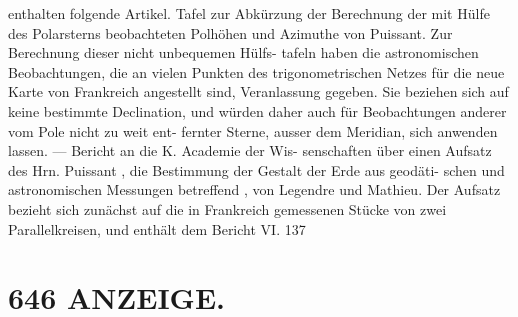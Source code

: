 \documentclass[12pt,a4paper]{article}
\begin{document}
{{{{{{{{enthalten  folgende  Artikel.  Tafel  zur  Abkürzung  der  Berechnung  der  mit  Hülfe  des  Polarsterns beobachteten  Polhöhen  und  Azimuthe  von  Puissant.  Zur  Berechnung  dieser  nicht  unbequemen  Hülfs- tafeln  haben  die  astronomischen  Beobachtungen,  die  an  vielen  Punkten  des  trigonometrischen  Netzes für  die  neue  Karte  von  Frankreich  angestellt  sind,  Veranlassung  gegeben.  Sie  beziehen  sich  auf  keine bestimmte  Declination,  und  würden  daher  auch  für  Beobachtungen  anderer  vom  Pole  nicht  zu  weit  ent- fernter Sterne,  ausser  dem  Meridian,  sich  anwenden  lassen.  ---  Bericht  an  die  K.  Academie  der  Wis- senschaften über  einen  Aufsatz  des  Hrn.  Puissant  ,  die  Bestimmung  der  Gestalt  der  Erde  aus  geodäti- schen und  astronomischen  Messungen  betreffend ,  von  Legendre  und  Mathieu.  Der  Aufsatz  bezieht  sich zunächst  auf  die  in  Frankreich  gemessenen  Stücke  von   zwei  Parallelkreisen,    und   enthält  dem  Bericht VI.  137


\section*{646  ANZEIGE.}

}}}}}}}}
\end{document}
